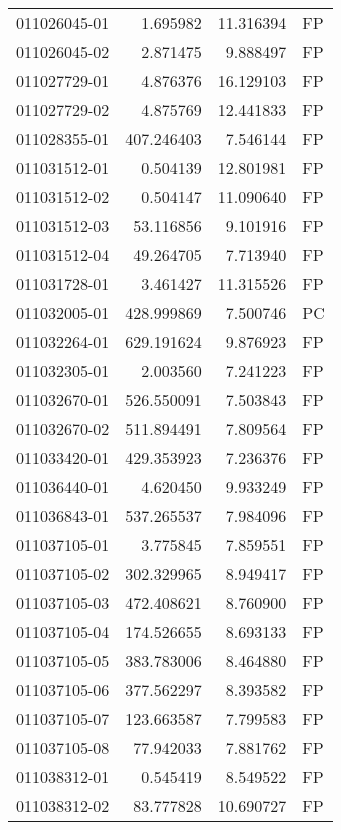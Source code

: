 \begin{tabular}{lrrl}
011026045-01 &    1.695982 &      11.316394 &   FP \\
011026045-02 &    2.871475 &       9.888497 &   FP \\
011027729-01 &    4.876376 &      16.129103 &   FP \\
011027729-02 &    4.875769 &      12.441833 &   FP \\
011028355-01 &  407.246403 &       7.546144 &   FP \\
011031512-01 &    0.504139 &      12.801981 &   FP \\
011031512-02 &    0.504147 &      11.090640 &   FP \\
011031512-03 &   53.116856 &       9.101916 &   FP \\
011031512-04 &   49.264705 &       7.713940 &   FP \\
011031728-01 &    3.461427 &      11.315526 &   FP \\
011032005-01 &  428.999869 &       7.500746 &   PC \\
011032264-01 &  629.191624 &       9.876923 &   FP \\
011032305-01 &    2.003560 &       7.241223 &   FP \\
011032670-01 &  526.550091 &       7.503843 &   FP \\
011032670-02 &  511.894491 &       7.809564 &   FP \\
011033420-01 &  429.353923 &       7.236376 &   FP \\
011036440-01 &    4.620450 &       9.933249 &   FP \\
011036843-01 &  537.265537 &       7.984096 &   FP \\
011037105-01 &    3.775845 &       7.859551 &   FP \\
011037105-02 &  302.329965 &       8.949417 &   FP \\
011037105-03 &  472.408621 &       8.760900 &   FP \\
011037105-04 &  174.526655 &       8.693133 &   FP \\
011037105-05 &  383.783006 &       8.464880 &   FP \\
011037105-06 &  377.562297 &       8.393582 &   FP \\
011037105-07 &  123.663587 &       7.799583 &   FP \\
011037105-08 &   77.942033 &       7.881762 &   FP \\
011038312-01 &    0.545419 &       8.549522 &   FP \\
011038312-02 &   83.777828 &      10.690727 &   FP \\

\end{tabular}
